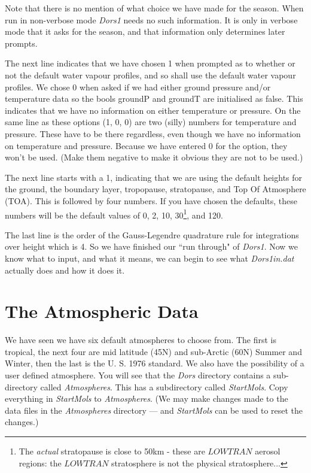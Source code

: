 \documentclass[12pt]{article}
\begin{document}
Note that there is no mention of what choice we have made for the season. When run in non-verbose mode
 {\it Dors1} needs no such information. It is only in verbose mode that it asks for the season, and that
 information only determines later prompts.

The next line indicates that we have chosen 1 when prompted as to whether or not
the default water vapour profiles, and so shall use the default water vapour profiles. We chose 0 
when asked if we had either ground pressure and/or temperature data 
so the bools groundP and groundT are initialised as false.
 This indicates that  we have no information  on either temperature or pressure. 
On the same line as these options (1, 0, 0) 
are two (silly) numbers for
temperature and pressure. These have to be there regardless, even though we have no information
on temperature and pressure. Because we have entered 0 for the option, they won't be used.  
(Make them negative to make it obvious they are not to be used.)

The next line starts with a 1, indicating that we are using the default heights for
the ground, the boundary layer, tropopause, stratopause, and Top Of Atmosphere (TOA).
This is followed by four numbers. If you have chosen the defaults, these numbers will be
the default values of 0, 2, 10, 30\footnote{The {\it actual} stratopause is close to 50km - these are
$LOWTRAN$ aerosol regions: the $LOWTRAN$ stratosphere is not the physical stratosphere...}, and 120.

The last line is the order of the Gauss-Legendre quadrature rule for integrations
over height which is 4. So we have finished our ``run through" of {\it Dors1}. Now we know what to input, and what it means, we
can begin to see what {\it Dors1in.dat} actually does and how it does it.




\section{The Atmospheric Data}

We have seen we have six default atmospheres to choose from. The first is tropical, the next four
are mid latitude (45N) and sub-Arctic (60N)  Summer and Winter, then the last is the U. S. 1976 standard. 
We also have the possibility of a user defined atmosphere.
You will see that the {\it Dors} directory contains a sub-directory  called {\it Atmospheres}.
This has a subdirectory called {\it StartMols}. Copy everything in {\it StartMols} to {\it Atmospheres}.
(We may make changes made to the data files in the {\it Atmospheres} directory  --- and {\it StartMols}
can be used to reset the changes.)
\end{document}
